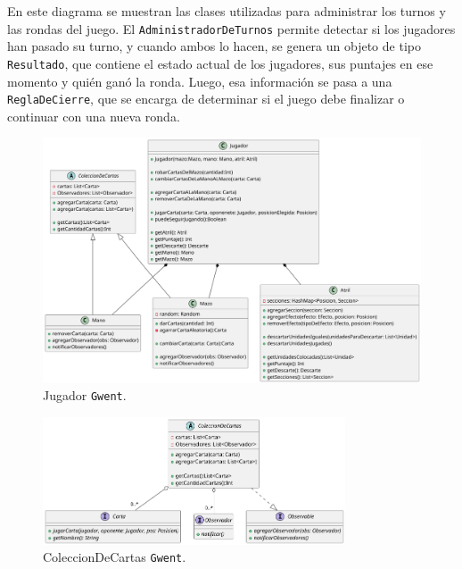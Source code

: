 \documentclass[titlepage,a4paper]{article}
\begin{document}
	En este diagrama se muestran las clases utilizadas para administrar los turnos y las rondas del juego.
	El \texttt{AdministradorDeTurnos} permite detectar si los jugadores han pasado su turno, y cuando ambos lo hacen, se genera un objeto de tipo \texttt{Resultado}, que contiene el estado actual de los jugadores, sus puntajes en ese momento y quién ganó la ronda.
	Luego, esa información se pasa a una \texttt{ReglaDeCierre}, que se encarga de determinar si el juego debe finalizar o continuar con una nueva ronda.

	\begin{figure}[H]
		\centering
		\includegraphics[width=1\textwidth]{diagramas/clases/Jugador}
		\caption{\label{fig:class02}Jugador \texttt{Gwent}.}
	\end{figure}

	\begin{figure}[H]
		\centering
		\includegraphics[width=0.8\textwidth]{diagramas/clases/ColeccionDeCartas}
		\caption{\label{fig:class03} ColeccionDeCartas \texttt{Gwent}.}
	\end{figure}
\end{document}
